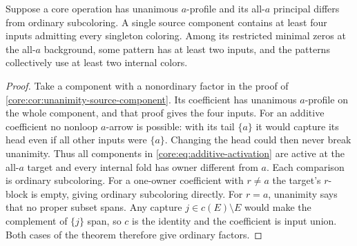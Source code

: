 \begin{corollary}
\label{core:cor:unanimity-component-patterns}
Suppose a core operation has unanimous $a$-profile and its all-$a$
principal differs from ordinary subcoloring. A single source
component contains at least four inputs admitting every singleton
coloring. Among its restricted minimal zeros at the all-$a$
background, some pattern has at least two inputs, and the patterns
collectively use at least two internal colors.
\end{corollary}
\begin{proof}
Take a component with a nonordinary factor in the proof of
\cref{core:cor:unanimity-source-component}. Its coefficient has
unanimous $a$-profile on the whole component, and that proof gives
the four inputs. For an additive coefficient no nonloop $a$-arrow
is possible: with its tail $\{a\}$ it would capture its head even
if all other inputs were $\{a\}$. Changing the head could then
never break unanimity. Thus all components in
\eqref{core:eq:additive-activation} are active at the all-$a$ target
and every internal fold has owner different from $a$. Each comparison
is ordinary subcoloring. For a one-owner coefficient with $r\ne a$
the target's $r$-block is empty, giving ordinary subcoloring directly.
For $r=a$, unanimity says that no proper subset spans. Any capture
$j\in c(E)\setminus E$ would make the complement of $\{j\}$ span,
so $c$ is the identity and the coefficient is input union. Both cases
of the theorem therefore give ordinary factors.
\end{proof}
